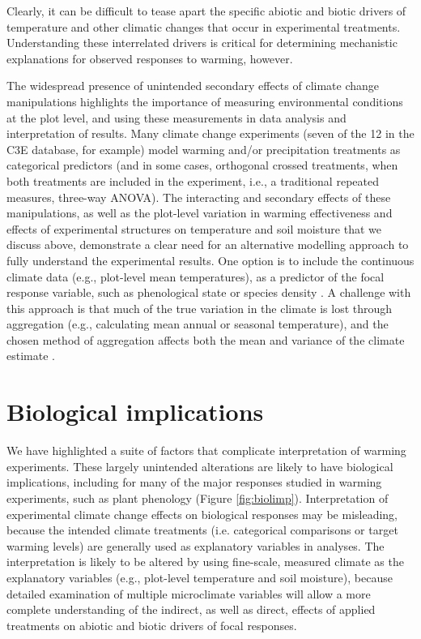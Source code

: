 \documentclass{article}
\begin{document}
Clearly, it can be difficult to tease apart the specific abiotic and biotic drivers of temperature and other climatic changes that occur in experimental treatments. Understanding these interrelated drivers is critical for determining mechanistic explanations for observed responses to warming, however. 
\par The widespread presence of unintended secondary effects of climate change manipulations highlights the importance of measuring environmental conditions at the plot level, and using these measurements in data analysis and interpretation of results. Many climate change experiments (seven of the 12 in the C3E database, for example) model warming and/or precipitation treatments as categorical predictors (and in some cases, orthogonal crossed treatments, when both treatments are included in the experiment, i.e., a traditional repeated measures, three-way ANOVA). The interacting and secondary effects of these manipulations, as well as the plot-level variation in warming effectiveness and effects of experimental structures on temperature and soil moisture that we discuss above, demonstrate a clear need for an alternative modelling approach to fully understand the experimental results. One option is to include the continuous climate data (e.g., plot-level mean temperatures), as a predictor of the focal response variable, such as phenological state or species density \citep [e.g.,][]{marchin2015, pelini2014}. A challenge with this approach is that much of the true variation in the climate is lost through aggregation (e.g., calculating mean annual or seasonal temperature), and the chosen method of aggregation affects both the mean and variance of the climate estimate \citep [e.g.,][]{clark2014b}. 

\section* {Biological implications}

\par We have highlighted a suite of factors that complicate interpretation of warming experiments. These largely unintended alterations are likely to have biological implications, including for many of the major responses studied in warming experiments, such as plant phenology (Figure \ref{fig:biolimp}). Interpretation of experimental climate change effects on biological responses may be misleading, because the intended climate treatments (i.e. categorical comparisons or target warming levels) are generally used as explanatory variables in analyses. The interpretation is likely to be altered by using fine-scale, measured climate as the explanatory variables (e.g., plot-level temperature and soil moisture), because detailed examination of multiple microclimate variables will allow a more complete understanding of the indirect, as well as direct, effects of applied treatments on abiotic and biotic drivers of focal responses.
\end{document}
